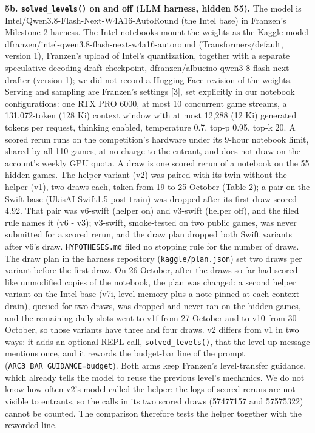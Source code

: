 \documentclass[
  11pt,
]{article}
\begin{document}
\textbf{5b. \texttt{solved\_levels()} on and off (LLM harness, hidden
55).} The model is Intel/Qwen3.8-Flash-Next-W4A16-AutoRound (the Intel
base) in Franzen's Milestone-2 harness. The Intel notebooks mount the
weights as the Kaggle model
dfranzen/intel-qwen3.8-flash-next-w4a16-autoround (Transformers/default,
version 1), Franzen's upload of Intel's quantization, together with a
separate speculative-decoding draft checkpoint,
dfranzen/albucino-qwen3-8-flash-next-drafter (version 1); we did not
record a Hugging Face revision of the weights. Serving and sampling are
Franzen's settings {[}3{]}, set explicitly in our notebook
configurations: one RTX PRO 6000, at most 10 concurrent game streams, a
131,072-token (128 Ki) context window with at most 12,288 (12 Ki)
generated tokens per request, thinking enabled, temperature 0.7, top-p
0.95, top-k 20. A scored rerun runs on the competition's hardware under
its 9-hour notebook limit, shared by all 110 games, at no charge to the
entrant, and does not draw on the account's weekly GPU quota. A draw is
one scored rerun of a notebook on the 55 hidden games. The helper
variant (v2) was paired with its twin without the helper (v1), two draws
each, taken from 19 to 25 October (Table 2); a pair on the Swift base
(UkisAI Swift1.5 post-train) was dropped after its first draw scored
4.92. That pair was v6-swift (helper on) and v3-swift (helper off), and
the filed rule names it (v6 - v3); v3-swift, smoke-tested on two public
games, was never submitted for a scored rerun, and the draw plan dropped
both Swift variants after v6's draw. \texttt{HYPOTHESES.md} filed no
stopping rule for the number of draws. The draw plan in the harness
repository (\texttt{kaggle/plan.json}) set two draws per variant before
the first draw. On 26 October, after the draws so far had scored like
unmodified copies of the notebook, the plan was changed: a second helper
variant on the Intel base (v7i, level memory plus a note pinned at each
context drain), queued for two draws, was dropped and never ran on the
hidden games, and the remaining daily slots went to v1f from 27 October
and to v10 from 30 October, so those variants have three and four draws.
v2 differs from v1 in two ways: it adds an optional REPL call,
\texttt{solved\_levels()}, that the level-up message mentions once, and
it rewords the budget-bar line of the prompt
(\texttt{ARC3\_BAR\_GUIDANCE=budget}). Both arms keep Franzen's
level-transfer guidance, which already tells the model to reuse the
previous level's mechanics. We do not know how often v2's model called
the helper: the logs of scored reruns are not visible to entrants, so
the calls in its two scored draws (57477157 and 57575322) cannot be
counted. The comparison therefore tests the helper together with the
reworded line.
\end{document}

